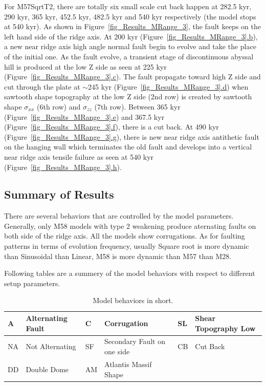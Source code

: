 For M57SqrtT2, there are totally six small scale cut back happen at 282.5 kyr, 290 kyr, 365 kyr, 452.5 kyr, 482.5 kyr and 540 kyr respectively (the model stops at 540 kyr). As shown in Figure~\hyperref[fig_Results_MRange_3]{\ref{fig_Results_MRange_3}}, the fault keeps on the left hand side of the ridge axis. At 200 kyr (Figure~\hyperref[fig_Results_MRange_3]{\ref{fig_Results_MRange_3}.b}), a new near ridge axis high angle normal fault begin to evolve and take the place of the initial one. As the fault evolve, a transient stage of discontinuous abyssal hill is produced at the low Z side as seen at 225 kyr (Figure~\hyperref[fig_Results_MRange_3]{\ref{fig_Results_MRange_3}.c}). The fault propagate toward high Z side and cut through the plate at $\sim$245 kyr (Figure~\hyperref[fig_Results_MRange_3]{\ref{fig_Results_MRange_3}.d}) when sawtooth shape topography at the low Z side (2nd row) is created by sawtooth shape $\sigma_{xx}$ (6th row) and $\sigma_{zz}$ (7th row). Between 365 kyr (Figure~\hyperref[fig_Results_MRange_3]{\ref{fig_Results_MRange_3}.e}) and 367.5 kyr (Figure~\hyperref[fig_Results_MRange_3]{\ref{fig_Results_MRange_3}.f}), there is a cut back. At 490 kyr (Figure~\hyperref[fig_Results_MRange_3]{\ref{fig_Results_MRange_3}.g}), there is new near ridge axis antithetic fault on the hanging wall which terminates the old fault and develops into a vertical near ridge axis tensile failure as seen at 540 kyr (Figure~\hyperref[fig_Results_MRange_3]{\ref{fig_Results_MRange_3}.h}).


\subsection{Summary of Results}
There are several behaviors that are controlled by the model parameters. Generally, only M58 models with type 2 weakening produce aternating faults on both side of the ridge axis. All the models show corrugations. As for faulting patterns in terms of evolution frequency, usually Square root is more dynamic than Sinusoidal than Linear, M58 is more dynamic than M57 than M28.

Following tables are a summery of the model behaviors with respect to different setup parameters.
 

\begin{table}[h]
\begin{small}
\begin{center}
\begin{tabular}{||l|l||l|l||l|l||}
\hline
A & Alternating Fault & C & Corrugation & SL & Shear Topography Low \\
\hline
NA& Not Alternating & SF & Secondary Fault on one side & CB & Cut Back   \\
\hline
DD &  Double Dome  & AM    & Atlantis Massif Shape &  &   \\
\hline
\end{tabular}
\end{center}
\end{small}
\caption{Model behaviors in short.}
\label{Tab1}
\end{table}

